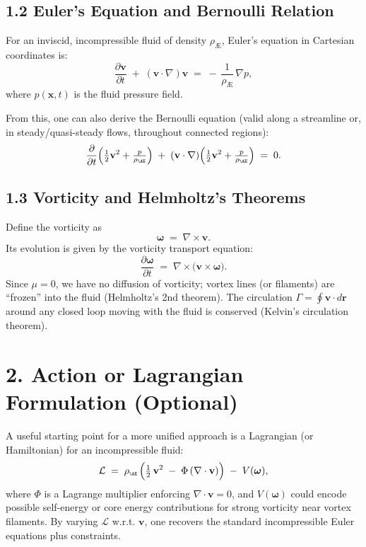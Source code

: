 \subsection*{1.2 Euler’s Equation and Bernoulli Relation}
For an inviscid, incompressible fluid of density \(\rho_{\scriptscriptstyle \mathrm{Æ}}\), Euler’s equation in Cartesian coordinates is:
\[
 \frac{\partial \mathbf{v}}{\partial t} \;+\; (\mathbf{v}\cdot\nabla)\mathbf{v} \;=\; -\,\frac{1}{\rho_{\scriptscriptstyle \mathrm{Æ}}}\,\nabla p,
\]
where \(p(\mathbf{x},t)\) is the fluid pressure field.

From this, one can also derive the Bernoulli equation (valid along a streamline or, in steady/quasi-steady flows, throughout connected regions):
\[
 \frac{\partial}{\partial t} \Bigl( \tfrac12 \mathbf{v}^2 + \tfrac{p}{\rho_{\scriptscriptstyle \mathrm{Æ}}} \Bigr) \;+\; (\mathbf{v}\cdot\nabla) \Bigl( \tfrac12 \mathbf{v}^2 + \tfrac{p}{\rho_{\scriptscriptstyle \mathrm{Æ}}} \Bigr) \;=\; 0.
\]

\subsection*{1.3 Vorticity and Helmholtz’s Theorems}
Define the vorticity as
\[
 \boldsymbol{\omega} \;=\; \nabla \times \mathbf{v}.
\]
Its evolution is given by the vorticity transport equation:
\[
 \frac{\partial \boldsymbol{\omega}}{\partial t} \;=\; \nabla\times\bigl(\mathbf{v}\times\boldsymbol{\omega}\bigr).
\]
Since \(\mu=0\), we have no diffusion of vorticity; vortex lines (or filaments) are “frozen” into the fluid (Helmholtz’s 2nd theorem). The circulation \(\Gamma = \oint \mathbf{v}\cdot d\mathbf{r}\) around any closed loop moving with the fluid is conserved (Kelvin’s circulation theorem).

\section*{2. Action or Lagrangian Formulation (Optional)}
A useful starting point for a more unified approach is a Lagrangian (or Hamiltonian) for an incompressible fluid:
\[
 \mathcal{L} \;=\; \rho_{\scriptscriptstyle \mathrm{Æ}}\, \Bigl( \tfrac12\,\mathbf{v}^2 \;-\; \Phi\,(\nabla\cdot\mathbf{v}) \Bigr) \;-\; V(\boldsymbol{\omega}),
\]
where \(\Phi\) is a Lagrange multiplier enforcing \(\nabla\cdot \mathbf{v}=0\), and \(V(\boldsymbol{\omega})\) could encode possible self-energy or core energy contributions for strong vorticity near vortex filaments. By varying \(\mathcal{L}\) w.r.t. \(\mathbf{v}\), one recovers the standard incompressible Euler equations plus constraints.


